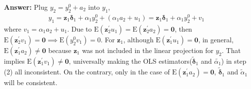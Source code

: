 \begin{enumerate}
    \textbf{Answer:} Plug $y_2=y_2^0+a_2$ into $y_1$,
    \begin{gather}
        y_{1}=\mathbf{z}_{1} \boldsymbol{\delta}_{1}+\alpha_{1} y_{2}^0+\left(\alpha_1 a_2 + u_{1}\right) = \mathbf{z}_{1} \boldsymbol{\delta}_{1}+\alpha_{1} y_{2}^0+v_1 \label{eq:5.11-1}
    \end{gather}
    where $v_1 = \alpha_1 a_2 + u_{1}$. Due to $\mathrm{E}(\mathbf{z}_2^\prime u_1) = \mathrm{E}(\mathbf{z}_2^\prime a_2) = \mathbf{0}$, then $\mathrm{E}(\mathbf{z}_2^\prime v_1) = \mathbf{0} \implies \mathrm{E}(y_2^0 v_1) = 0$. For $\mathbf{z}_1$, although $\mathrm{E}(\mathbf{z}_1^\prime u_1) = \mathbf{0}$, in general, $\mathrm{E}(\mathbf{z}_1^\prime a_2) \neq \mathbf{0}$ because $\mathbf{z}_1$ was not included in the linear projection for $y_2$. That implies $\mathrm{E}(\mathbf{z}_1^\prime v_1) \neq \mathbf{0}$, universally making the OLS estimators($\tilde{\bm{\delta}}_1$ and $\tilde{\alpha_1}$) in step (2) all inconsistent. On the contrary, only in the case of $\mathrm{E}(\mathbf{z}_1^\prime a_2) = \mathbf{0}$, $\tilde{\boldsymbol{\delta}}_{1}$ and $\tilde{\alpha}_{1}$ will be consistent.
\end{enumerate}